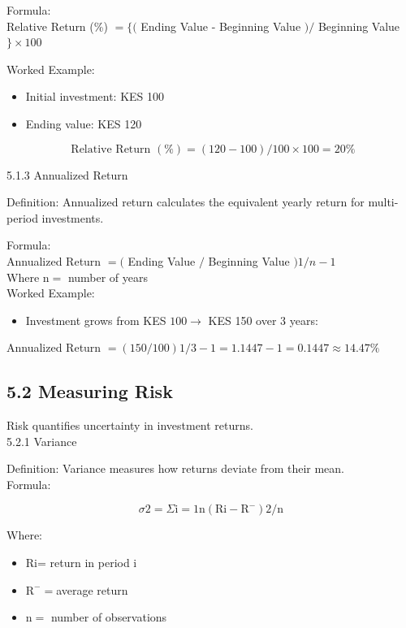 \documentclass[10pt]{article}
\begin{document}
Formula:\\
Relative Return (\%) $=\{($ Ending Value - Beginning Value $) /$ Beginning Value $\} \times 100$

Worked Example:

\begin{itemize}
  \item Initial investment: KES 100
  \item Ending value: KES 120
\end{itemize}

$$
\text { Relative Return }(\%)=(120-100) / 100 \times 100=20 \%
$$

5.1.3 Annualized Return

Definition: Annualized return calculates the equivalent yearly return for multi-period investments.

Formula:\\
Annualized Return $=($ Ending Value $/$ Beginning Value $) 1 / n-1$\\
Where $\mathrm{n}=$ number of years\\
Worked Example:

\begin{itemize}
  \item Investment grows from KES $100 \rightarrow$ KES 150 over 3 years:
\end{itemize}

Annualized Return $=(150 / 100) 1 / 3-1=1.1447-1=0.1447 \approx 14.47 \%$

\subsection*{5.2 Measuring Risk}
Risk quantifies uncertainty in investment returns.\\
5.2.1 Variance

Definition: Variance measures how returns deviate from their mean.\\
Formula:

$$
\sigma 2=\Sigma \mathrm{i}=1 \mathrm{n}\left(\mathrm{Ri}-\mathrm{R}^{-}\right) 2 / \mathrm{n}
$$

Where:

\begin{itemize}
  \item Ri= return in period i
  \item $\mathrm{R}^{-}=$average return
  \item $\mathrm{n}=$ number of observations
\end{itemize}
\end{document}
